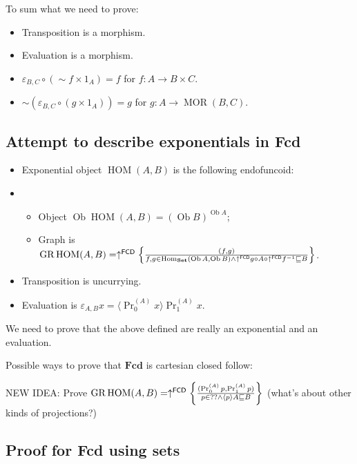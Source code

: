 To sum what we need to prove:
\begin{itemize}
\item Transposition is a morphism.
\item Evaluation is a morphism.
\item $\varepsilon_{B,C} \circ ( \sim f \times 1_A) = f$ for $f : A \rightarrow B \times C$.
\item $\sim ( \varepsilon_{B,C} \circ ( g \times 1_A)) = g$ for $g : A \rightarrow \operatorname{MOR} ( B , C)$.
\end{itemize}

\subsection{Attempt to describe exponentials in Fcd}

\begin{itemize}
\item Exponential object $\operatorname{HOM}(A,B)$ is the following endofuncoid:
\item\begin{itemize}
\item Object $\operatorname{Ob}\operatorname{HOM}(A,B) = (\operatorname{Ob} B)^{\operatorname{Ob} A}$;
\item Graph is $\operatorname{GR} \operatorname{HOM} ( A , B) = \uparrow^{\mathsf{FCD}} \left\{ \frac{ ( f , g) }{ f, g \in \operatorname{Hom}_{\mathbf{Set}} (\operatorname{Ob} A,\operatorname{Ob} B) \wedge \uparrow^{\mathsf{FCD}}g \circ A \circ \uparrow^{\mathsf{FCD}}f^{- 1} \sqsubseteq B }\right\}$.
\end{itemize}
\item Transposition is uncurrying.
\item Evaluation is $\varepsilon_{A, B} x = \langle \operatorname{Pr}^{(A)}_0 x \rangle \operatorname{Pr}^{(A)}_1 x$.
\end{itemize}

We need to prove that the above defined are really an exponential and an evaluation.

Possible ways to prove that $\mathbf{Fcd}$ is cartesian closed follow:

NEW IDEA: Prove $\operatorname{GR}\operatorname{HOM}(A,B) =
\uparrow^{\mathsf{FCD}}\left\{ \frac{(\Pr^{(A)}_0 p,\Pr^{(A)}_1 p)}{
p\in??\land\left\langle p\right\rangle A\sqsubseteq B}\right\}$ (what's about other
kinds of projections?)

\subsection{Proof for Fcd using sets}

